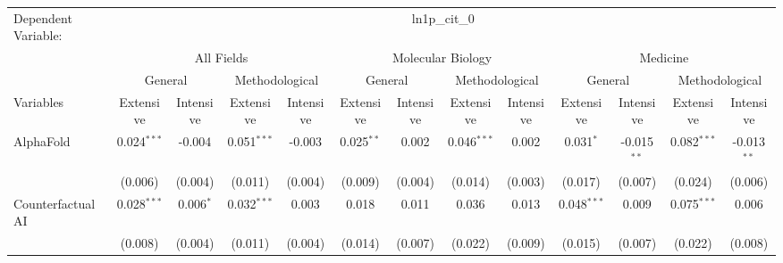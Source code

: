 \begingroup
\centering
\begin{tabular}{lcccccccccccc}
   \tabularnewline \midrule \midrule
   Dependent Variable: & \multicolumn{12}{c}{ln1p\_cit\_0}\\
 & \multicolumn{4}{c}{All Fields} & \multicolumn{4}{c}{Molecular Biology} & \multicolumn{4}{c}{Medicine} \\
\cmidrule(lr){2-5} \cmidrule(lr){6-9} \cmidrule(lr){10-13}
 & \multicolumn{2}{c}{General} & \multicolumn{2}{c}{Methodological} & \multicolumn{2}{c}{General} & \multicolumn{2}{c}{Methodological} & \multicolumn{2}{c}{General} & \multicolumn{2}{c}{Methodological} \\
\cmidrule(lr){2-3} \cmidrule(lr){4-5} \cmidrule(lr){6-7} \cmidrule(lr){8-9} \cmidrule(lr){10-11} \cmidrule(lr){12-13}
Variables & \multicolumn{1}{c}{Extensive} & \multicolumn{1}{c}{Intensive} & \multicolumn{1}{c}{Extensive} & \multicolumn{1}{c}{Intensive} & \multicolumn{1}{c}{Extensive} & \multicolumn{1}{c}{Intensive} & \multicolumn{1}{c}{Extensive} & \multicolumn{1}{c}{Intensive} & \multicolumn{1}{c}{Extensive} & \multicolumn{1}{c}{Intensive} & \multicolumn{1}{c}{Extensive} & \multicolumn{1}{c}{Intensive} \\
\cmidrule(lr){1-1}\cmidrule(lr){2-2} \cmidrule(lr){3-3} \cmidrule(lr){4-4} \cmidrule(lr){5-5} \cmidrule(lr){6-6} \cmidrule(lr){7-7} \cmidrule(lr){8-8} \cmidrule(lr){9-9} \cmidrule(lr){10-10} \cmidrule(lr){11-11} \cmidrule(lr){12-12} \cmidrule(lr){13-13}
   AlphaFold                                & 0.024$^{***}$ & -0.004        & 0.051$^{***}$ & -0.003         & 0.025$^{**}$  & 0.002          & 0.046$^{***}$ & 0.002         & 0.031$^{*}$   & -0.015$^{**}$ & 0.082$^{***}$ & -0.013$^{**}$\\   
                                            & (0.006)       & (0.004)       & (0.011)       & (0.004)        & (0.009)       & (0.004)        & (0.014)       & (0.003)       & (0.017)       & (0.007)       & (0.024)       & (0.006)\\   
   Counterfactual AI                        & 0.028$^{***}$ & 0.006$^{*}$   & 0.032$^{***}$ & 0.003          & 0.018         & 0.011          & 0.036         & 0.013         & 0.048$^{***}$ & 0.009         & 0.075$^{***}$ & 0.006\\   
                                            & (0.008)       & (0.004)       & (0.011)       & (0.004)        & (0.014)       & (0.007)        & (0.022)       & (0.009)       & (0.015)       & (0.007)       & (0.022)       & (0.008)\\   

\end{tabular}
